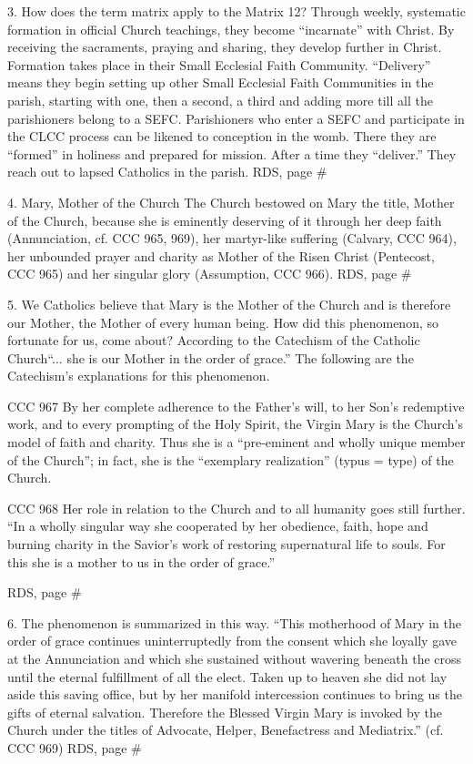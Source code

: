 \documentclass[oneside]{book}
\begin{document}
3. How does the term matrix apply to the Matrix 12? Through weekly, systematic
formation in official Church teachings, they become ``incarnate'' with
Christ. By receiving the sacraments, praying and sharing, they develop further
in Christ. Formation takes place in their Small Ecclesial Faith
Community. ``Delivery'' means they begin setting up other Small Ecclesial Faith
Communities in the parish, starting with one, then a second, a third and adding
more till all the parishioners belong to a SEFC. Parishioners who enter a SEFC
and participate in the CLCC process can be likened to conception in the
womb. There they are ``formed'' in holiness and prepared for mission. After a
time they ``deliver.'' They reach out to lapsed Catholics in the parish.
RDS, page \#

4. Mary, Mother of the Church
The Church bestowed on Mary the title, Mother of the Church, because she is
eminently deserving of it through her deep faith (Annunciation, cf. CCC 965,
969), her martyr-like suffering (Calvary, CCC 964), her unbounded prayer and
charity as Mother of the Risen Christ (Pentecost, CCC 965) and her singular
glory (Assumption, CCC 966).
RDS, page \#

5. We Catholics believe that Mary is the Mother of the Church and is therefore
our Mother, the Mother of every human being. How did this phenomenon, so
fortunate for us, come about? According to the Catechism of the Catholic
Church``... she is our Mother in the order of grace.'' The following are the
Catechism's explanations for this phenomenon.

CCC 967
By her complete adherence to the Father's will, to her Son's redemptive work,
and to every prompting of the Holy Spirit, the Virgin Mary is the Church's model
of faith and charity. Thus she is a ``pre-eminent and wholly unique member of
the Church''; in fact, she is the ``exemplary realization'' (typus = type) of
the Church.

CCC 968
Her role in relation to the Church and to all humanity goes still further. ``In
a wholly singular way she cooperated by her obedience, faith, hope and burning
charity in the Savior's work of restoring supernatural life to souls. For this
she is a mother to us in the order of grace.''

RDS, page \#

6. The phenomenon is summarized in this way. ``This motherhood of Mary in the
order of grace continues uninterruptedly from the consent which she loyally gave
at the Annunciation and which she sustained without wavering beneath the cross
until the eternal fulfillment of all the elect. Taken up to heaven she did not
lay aside this saving office, but by her manifold intercession continues to
bring us the gifts of eternal salvation. Therefore the Blessed Virgin Mary is
invoked by the Church under the titles of Advocate, Helper, Benefactress and
Mediatrix.'' (cf. CCC 969)
RDS, page \#
\end{document}
